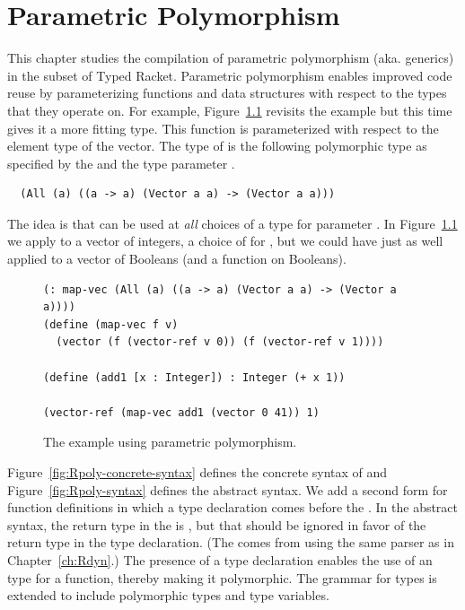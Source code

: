 \documentclass[11pt]{book}
\begin{document}
\chapter{Parametric Polymorphism}
\label{ch:Rpoly}

This chapter studies the compilation of parametric
polymorphism
(aka. generics) in the subset \LangPoly{} of Typed
Racket. Parametric polymorphism enables improved code reuse by
parameterizing functions and data structures with respect to the types
that they operate on. For example, Figure~\ref{fig:map-vec-poly}
revisits the  example but this time gives it a more
fitting type.  This  function is parameterized with
respect to the element type of the vector. The type of 
is the following polymorphic type as specified by the  and
the type parameter .
\begin{lstlisting}
  (All (a) ((a -> a) (Vector a a) -> (Vector a a)))
\end{lstlisting}
The idea is that  can be used at \emph{all} choices of a
type for parameter . In Figure~\ref{fig:map-vec-poly} we apply
 to a vector of integers, a choice of  for
, but we could have just as well applied  to a
vector of Booleans (and a function on Booleans).

\begin{figure}[tbp]
\begin{lstlisting}
(: map-vec (All (a) ((a -> a) (Vector a a) -> (Vector a a))))
(define (map-vec f v)
  (vector (f (vector-ref v 0)) (f (vector-ref v 1))))

(define (add1 [x : Integer]) : Integer (+ x 1))

(vector-ref (map-vec add1 (vector 0 41)) 1)
\end{lstlisting}
\caption{The  example using parametric polymorphism.}
\label{fig:map-vec-poly}
\end{figure}

Figure~\ref{fig:Rpoly-concrete-syntax} defines the concrete syntax of
\LangPoly{} and Figure~\ref{fig:Rpoly-syntax} defines the abstract
syntax. We add a second form for function definitions in which a type
declaration comes before the . In the abstract syntax,
the return type in the  is , but that should be
ignored in favor of the return type in the type declaration.  (The
 comes from using the same parser as in
Chapter~\ref{ch:Rdyn}.)  The presence of a type declaration
enables the use of an  type for a function, thereby making
it polymorphic. The grammar for types is extended to include
polymorphic types and type variables.
\end{document}
